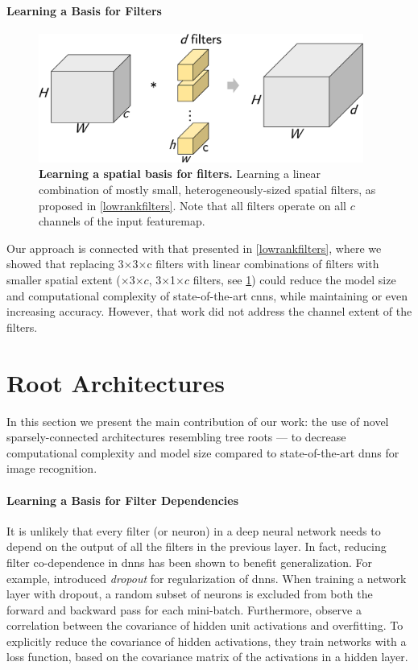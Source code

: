 \documentclass[thesis]{subfiles}
\begin{document}
	\paragraph{Learning a Basis for Filters}
	\begin{figure}[tbp]
		\centering
		\includegraphics[width=0.95\textwidth, page=3]{Figs/PDF/sparsification}
		\caption[Learning a spatial basis for filters]{\textbf{Learning a spatial basis for filters.} Learning a linear combination of mostly small, heterogeneously-sized spatial filters, as proposed in \cref{lowrankfilters}. Note that all filters operate on all $c$ channels of the input \gls{featuremap}.}
		\label{fig:spatialbasis}
	\end{figure}
	Our approach is connected with that presented in \cref{lowrankfilters}, where we showed that replacing 3$\times$3$\times$c filters with linear combinations of filters with smaller spatial extent ($\times$3$\times c$, 3$\times$1$\times c$ filters, see \cref{fig:spatialbasis}) could reduce the model size and computational complexity of state-of-the-art \glspl{cnn}, while maintaining or even increasing accuracy. However, that work did not address the channel extent of the filters.
	\section{Root Architectures}
	\label{method}
	In this section we present the main contribution of our work: the use of novel sparsely-connected architectures resembling tree roots --- to decrease computational complexity and model size compared to state-of-the-art \glspl{dnn} for image recognition.
	
	\paragraph{Learning a Basis for Filter Dependencies}
	It is unlikely that every filter (or neuron) in a deep neural network needs to depend on the output of all the filters in the previous layer. In fact, reducing filter co-dependence in \glspl{dnn} has been shown to benefit generalization. For example, \citet{Hinton2012} introduced {\em dropout} for regularization of \glspl{dnn}. When training a network layer with dropout, a random subset of neurons is excluded from both the forward and backward pass for each mini-batch.  Furthermore, \citet{Cogswell2016} observe a correlation between the covariance of hidden unit activations and overfitting. To explicitly reduce the covariance of hidden activations, they train networks with a loss function, based on the covariance matrix of the activations in a hidden layer. 
	
\end{document}

